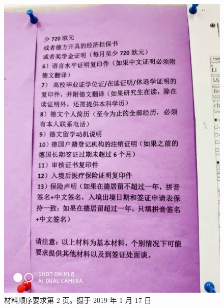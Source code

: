 \documentclass[final]{book}
\begin{document}
\begin{appendices}
\begin{figure}[htbp]
  \includegraphics[width=\textwidth]{order-2}
  \caption{材料顺序要求第 2 页。摄于 2019 年 1 月 17 日}
  \label{fig:order-2}
\end{figure}
\begin{figure}[htbp]
  \centering

\end{figure}
\end{appendices}
\end{document}
